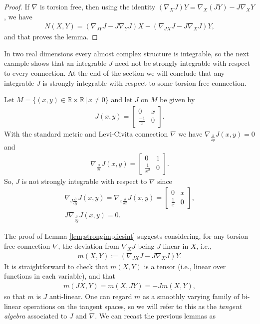 \documentclass[10pt,a4paper]{amsart}
\numberwithin{equation}{section}
\newcommand{\R}{\mathbb{R}}
\begin{document}
\begin{proof}
If $\nabla$ is torsion free, then using the identity $(\nabla_X J) Y = \nabla_X (J Y) - J \nabla_X Y$, we have
\begin{gather}
N(X,Y) = (\nabla_{JY} J - J \nabla_Y J) X - (\nabla_{JX} J - J \nabla_X J)Y, \label{eq:Nnabla}
\end{gather}
and that proves the lemma.
\end{proof}

In two real dimensions every almost complex structure is integrable, so the next example shows that an integrable $J$ need not be strongly integrable with respect to every connection. At the end of the section we will conclude that any integrable $J$ is strongly integrable with respect to some torsion free connection.

\begin{ex} \label{ex;2dex}Let $M = \{ (x,y) \in \R \times \R\, | \, x \neq 0 \}$ and let
$J$ on $M$ be given by
\begin{gather*}
J(x,y) =
\begin{bmatrix}
0 & x \\
\frac {-1}{ x} & 0
\end{bmatrix}.
\end{gather*}
With the standard metric and Levi-Civita connection $\nabla$ we have $\nabla_{\frac{\partial }{\partial y}} J(x,y) = 0$
and
\begin{gather*}
\nabla_{\frac{\partial }{\partial x}} J(x,y) =
\begin{bmatrix}
0 & 1 \\
\frac{1}{ x^2} & 0
\end{bmatrix}.
\end{gather*}
So, $J$ is not strongly integrable with respect to $\nabla$ since
\begin{gather*}
 \nabla_{ J \frac{\partial }{\partial y}} J(x,y)= \nabla_{x \frac{\partial }{\partial x}} J(x,y) =
\begin{bmatrix}
0 & x \\
\frac{1}{ x} & 0
\end{bmatrix}, \\
J \nabla_{\frac{\partial }{\partial y}} J(x,y)= 0 .
\end{gather*}
\end{ex}

The proof of Lemma \ref{lem;strongimpliesint} suggests considering, for any torsion free connection $\nabla$, the deviation from $\nabla_X J$ being $J$-linear in $X$, i.e.,
\begin{gather} \label{eq:tanalg}
m(X,Y) := ( \nabla_{JX} J - J \nabla_X J ) Y.
\end{gather}
It is straightforward to check that $m(X,Y)$ is a tensor (i.e., linear over functions in each variable), and that
\begin{gather} \label{eq:misJantilinear}
m(JX,Y) = m(X,JY) = - J m(X,Y),
\end{gather}
so that $m$ is $J$ anti-linear. One can regard $m$ as a smoothly varying family of bi-linear operations on the tangent spaces, so we will refer to this as the \emph{tangent algebra} associated to $J$ and $\nabla$.
We can recast the previous lemmas as
\end{document}
